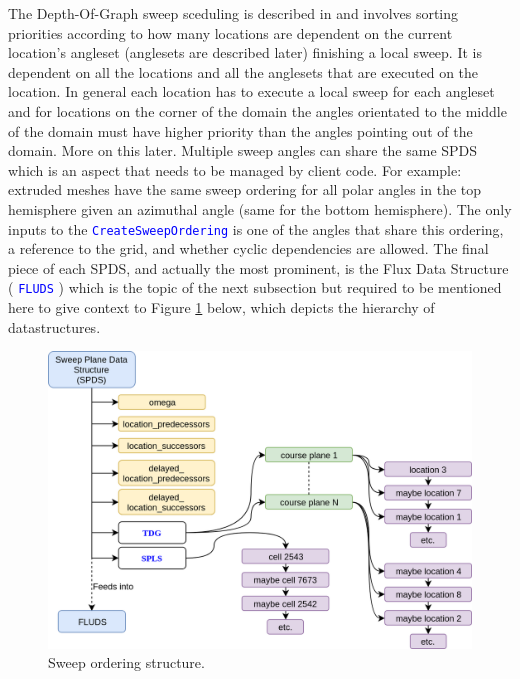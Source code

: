 \documentclass[11pt,letterpaper,titlepage]{article}
\newcommand{\xmltag}[1]{\textcolor{blue}{ \texttt{#1}} }
\numberwithin{equation}{section}
\begin{document}
The Depth-Of-Graph sweep sceduling is described in \cite{ProvablyOptimalSweep} and involves sorting priorities according to how many locations are dependent on the current location's angleset (anglesets are described later) finishing a local sweep. It is dependent on all the locations and all the anglesets that are executed on the location. In general each location has to execute a local sweep for each angleset and for locations on the corner of the domain the angles orientated to the middle of the domain must have higher priority than the angles pointing out of the domain. More on this later.
\newline
\newline
Multiple sweep angles can share the same SPDS which is an aspect that needs to be managed by client code. For example: extruded meshes have the same sweep ordering for all polar angles in the top hemisphere given an azimuthal angle (same for the bottom hemisphere). The only inputs to the \xmltag{CreateSweepOrdering} is one of the angles that share this ordering, a reference to the grid, and whether cyclic dependencies are allowed. 
\newline
\newline
The final piece of each SPDS, and actually the most prominent, is the Flux Data Structure (\xmltag{FLUDS}) which is the topic of the next subsection but required to be mentioned here to give context to Figure \ref{fig:sweepordering} below, which depicts the hierarchy of datastructures.
\vspace{0.5cm}
\begin{figure}[H]
\centering
\includegraphics[width=0.9\linewidth]{LatexDraw/SweepOrdering}
\caption{Sweep ordering structure.}
\label{fig:sweepordering}
\end{figure}
\end{document}
